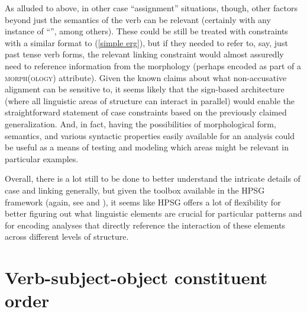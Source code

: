 \documentclass[output=paper
                ,modfonts
                ,nonflat
	        ,collection
	        ,collectionchapter
	        ,collectiontoclongg
 	        ,biblatex
                ,babelshorthands
                ,newtxmath
                ,draftmode
                ,colorlinks, citecolor=brown
]{./langsci/langscibook}
\begin{document}
{As alluded to above, in other case ``assignment'' situations, though, other factors beyond just the semantics of the verb can be relevant (certainly with any instance of ``'', among others). These could be still be treated with constraints with a similar format to (\ref{simple erg}), but if they needed to refer to, say, just past tense verb forms, the relevant linking constraint would almost assuredly need to reference information from the morphology (perhaps encoded as part of a \textsc{morph(ology)} attribute). Given the known claims about what non-accusative alignment can be sensitive to,  it seems likely that the sign-based architecture (where all linguistic areas of structure can interact in parallel) would enable the straightforward statement of case constraints based on the previously claimed generalization. And, in fact, having the possibilities of morphological form, semantics, and various syntactic properties easily available for an analysis could be useful as a means of testing and modeling which areas might be relevant in particular examples.

Overall, there is a lot still to be done to better understand the intricate details of case and linking generally, but given the toolbox available in the HPSG framework (again, see  and ), it seems like HPSG offers a lot of flexibility for better figuring out what linguistic elements are crucial for particular patterns and for encoding analyses that directly reference the interaction of these elements across different levels of structure.      

\section{Verb-subject-object constituent order}

}
\end{document}
